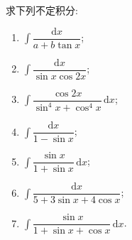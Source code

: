 \documentclass[../数学分析培优讲义.tex]{subfiles}
\begin{document}
\begin{example}
求下列不定积分:
\begin{enumerate}[label=(\arabic*)]
    \item $\displaystyle\int\dfrac{\mathrm{d}x}{a+b\tan x}$;
    \item $\displaystyle\int\dfrac{\mathrm{d}x}{\sin x\cos2x}$;
    \item $\displaystyle\int\dfrac{\cos2x}{\sin^4x+\cos^4x}\,\mathrm{d}x$;
    \item $\displaystyle\int\dfrac{\mathrm{d}x}{1-\sin x}$;
    \item $\displaystyle\int\dfrac{\sin x}{1+\sin x}\,\mathrm{d}x$;
    \item $\displaystyle\int\dfrac{\mathrm{d}x}{5+3\sin x+4\cos x}$;
    \item $\displaystyle\int\dfrac{\sin x}{1+\sin x+\cos x}\,\mathrm{d}x$.
\end{enumerate}
\end{example}
\exampleblank
\end{document}
